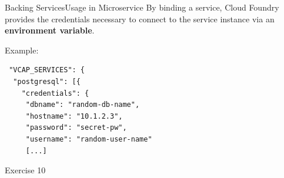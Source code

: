 \begin{frame}[fragile]{Backing Services}{Usage in Microservice}
By binding a service, Cloud Foundry provides the credentials necessary to connect to the service instance via an \textbf{environment variable}.
\vfill

Example:
\begin{block}{}
\vspace{-5mm}
\scriptsize
\begin{verbatim}
 "VCAP_SERVICES": {
  "postgresql": [{
    "credentials": {
     "dbname": "random-db-name",
     "hostname": "10.1.2.3",
     "password": "secret-pw",
     "username": "random-user-name"
     [...]
\end{verbatim}
\vspace{-5mm}
\end{block}

\end{frame}


\begin{frame}{Exercise 10}
	\begin{figure}
	\end{figure}
\end{frame}


